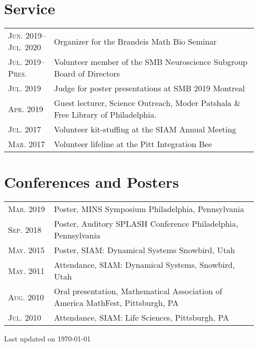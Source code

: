 \documentclass[a4paper,10pt]{article}
\newcommand{\updateinfo}[1][\today]{\par\vfill\hfill{\scriptsize\color{gray}Last updated on #1}}
\begin{document}
\section{Service}
\begin{tabular}{p{0.18\linewidth}p{0.8\linewidth}}
\textsc{Jun. 2019--Jul. 2020} & Organizer for the Brandeis Math Bio Seminar\\
\textsc{Jul. 2019--Pres.} & Volunteer member of the SMB Neuroscience Subgroup Board of Directors\\
\textsc{Jul. 2019} & Judge for poster presentations at SMB 2019 Montreal\\
\textsc{Apr. 2019} & Guest lecturer, Science Outreach, Moder Patshala \& Free Library of Philadelphia.\\
\textsc{Jul. 2017} & Volunteer kit-stuffing at the SIAM Annual Meeting\\
\textsc{Mar. 2017} & Volunteer lifeline at the Pitt Integration Bee\\
\end{tabular}

\section{Conferences and Posters}
\begin{longtable}{p{0.18\linewidth}p{0.8\linewidth}}
\textsc{Mar.} 2019 & Poster, MINS Symposium Philadelphia, Pennsylvania\\
\textsc{Sep.} 2018 & Poster, Auditory SPLASH Conference Philadelphia, Pennsylvania\\
\textsc{May.} 2015 & Poster, SIAM: Dynamical Systems Snowbird, Utah\\
\textsc{May.} 2011 & Attendance, SIAM: Dynamical Systems, Snowbird, Utah\\
\textsc{Aug.} 2010 & Oral presentation, Mathematical Association of America MathFest, Pittsburgh, PA\\
\textsc{Jul.} 2010 & Attendance, SIAM: Life Sciences, Pittsburgh, PA
\end{longtable}


\updateinfo
\end{document}
